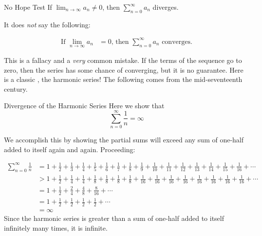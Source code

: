 \begin{theorem}{No Hope Test}
If $\lim_{n\rightarrow \infty} a_n \not = 0$, then $\sum_{n=0}^\infty a_n$ diverges.
\end{theorem}

It does \emph{not} say the following: 
\begin{center}
\begin{align*}
\text{If }\lim_{n\rightarrow \infty} a_n  &= 0\text{, then }\sum_{n=0}^\infty a_n\text{ converges.} \tag{\Frowny}
\end{align*}
\end{center}
  This is a fallacy and a \emph{very} common mistake.  If the terms of the sequence go to zero, then the series has some chance of converging, but it is no guarantee.  Here is a classic , the harmonic series!  The following  comes from the mid-seventeenth century.

\begin{example}{Divergence of the Harmonic Series}\label{Bern}
Here we show that $$\sum_{n=0}^\infty \frac{1}{n}=\infty $$

We accomplish this by showing the partial sums will exceed any sum of one-half added to itself again and again.  Proceeding:

\begin{align*}
\sum_{n=0}^\infty \frac{1}{n}&=1+\frac{1}{2}+\frac{1}{3}+\frac{1}{4}+\frac{1}{5}+\frac{1}{6}+\frac{1}{7}+\frac{1}{8}+\frac{1}{9}+\frac{1}{10}+\frac{1}{11}+\frac{1}{12}+\frac{1}{13}+\frac{1}{14}+\frac{1}{15}+\frac{1}{16}+\cdots \\
&>1+\frac{1}{2}+\frac{1}{4}+\frac{1}{4}+\frac{1}{8}+\frac{1}{8}+\frac{1}{8}+\frac{1}{8}+\frac{1}{16}+\frac{1}{16}+\frac{1}{16}+\frac{1}{16}+\frac{1}{16}+\frac{1}{16}+\frac{1}{16}+\frac{1}{16}+\cdots \\
&=1+\frac{1}{2}+\frac{2}{4}+\frac{4}{8}+\frac{8}{16}+\cdots \\
&=1+\frac{1}{2}+\frac{1}{2}+\frac{1}{2}+\frac{1}{2}+\cdots \\
&=\infty
\end{align*}
Since the harmonic series is greater than a sum of one-half added to itself infinitely many times, it is infinite.
\end{example}

